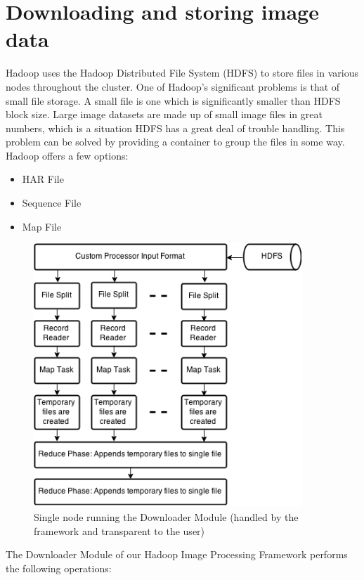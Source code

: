 \documentclass{osuthesis}
\begin{document}
				\section{Downloading and storing image data}
				Hadoop uses the Hadoop Distributed File System (HDFS)\cite{Shvachko2010} to store files
				in various nodes throughout the cluster.  One of Hadoop's significant
				problems is that of small file storage. \cite{White2009} A small file
				is one which is significantly smaller than HDFS block size.  Large
				image datasets are made up of small image files in great numbers,
				which is a situation HDFS has a great deal of trouble
				handling. This problem can be solved by providing a container to group
				the files in some way. Hadoop offers a few options:
				\begin{itemize}
					\item HAR File
					\item Sequence File
					\item Map File
				\end{itemize}
				\begin{figure}[h]
					\centering
					\includegraphics[width=0.90\textwidth]{down-node}
					\caption{Single node running the Downloader Module (handled by
						the framework and transparent to the user)}
					\label{fig:down-node}
				\end{figure}
				The Downloader Module of our Hadoop Image Processing Framework
				performs the following operations:
				
\end{document}
